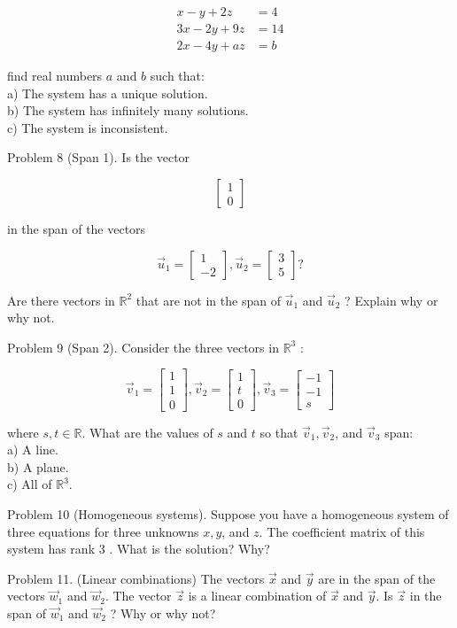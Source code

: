 \documentclass[10pt]{article}
\begin{document}
$$
\begin{aligned}
x-y+2 z & =4 \\
3 x-2 y+9 z & =14 \\
2 x-4 y+a z & =b
\end{aligned}
$$

find real numbers $a$ and $b$ such that:\\
a) The system has a unique solution.\\
b) The system has infinitely many solutions.\\
c) The system is inconsistent.

Problem 8 (Span 1). Is the vector

$$
\left[\begin{array}{l}
1 \\
0
\end{array}\right]
$$

in the span of the vectors

$$
\vec{u}_{1}=\left[\begin{array}{c}
1 \\
-2
\end{array}\right], \vec{u}_{2}=\left[\begin{array}{l}
3 \\
5
\end{array}\right] ?
$$

Are there vectors in $\mathbb{R}^{2}$ that are not in the span of $\vec{u}_{1}$ and $\vec{u}_{2}$ ? Explain why or why not.

Problem 9 (Span 2). Consider the three vectors in $\mathbb{R}^{3}$ :

$$
\vec{v}_{1}=\left[\begin{array}{l}
1 \\
1 \\
0
\end{array}\right], \vec{v}_{2}=\left[\begin{array}{l}
1 \\
t \\
0
\end{array}\right], \vec{v}_{3}=\left[\begin{array}{c}
-1 \\
-1 \\
s
\end{array}\right]
$$

where $s, t \in \mathbb{R}$. What are the values of $s$ and $t$ so that $\vec{v}_{1}, \vec{v}_{2}$, and $\vec{v}_{3}$ span:\\
a) A line.\\
b) A plane.\\
c) All of $\mathbb{R}^{3}$.

Problem 10 (Homogeneous systems). Suppose you have a homogeneous system of three equations for three unknowns $x, y$, and $z$. The coefficient matrix of this system has rank 3 . What is the solution? Why?

Problem 11. (Linear combinations) The vectors $\vec{x}$ and $\vec{y}$ are in the span of the vectors $\vec{w}_{1}$ and $\vec{w}_{2}$. The vector $\vec{z}$ is a linear combination of $\vec{x}$ and $\vec{y}$. Is $\vec{z}$ in the span of $\vec{w}_{1}$ and $\vec{w}_{2}$ ? Why or why not?
\end{document}
